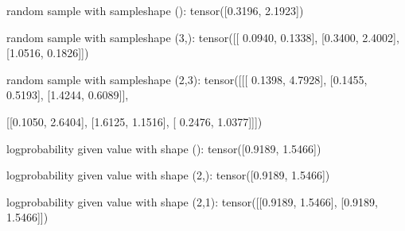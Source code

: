 \documentclass[letterpaper,10pt,english]{sphinxmanual}
\begin{document}
\begin{sphinxVerbatim}[commandchars=\\\{\}]
random sample with sample\PYGZus{}shape ():
 tensor([0.3196, 2.1923]) 

random sample with sample\PYGZus{}shape (3,):
 tensor([[ 0.0940,  0.1338],
        [\PYGZhy{}0.3400,  2.4002],
        [\PYGZhy{}1.0516, \PYGZhy{}0.1826]]) 

random sample with sample\PYGZus{}shape (2,3):
 tensor([[[ 0.1398,  4.7928],
         [\PYGZhy{}0.1455, \PYGZhy{}0.5193],
         [\PYGZhy{}1.4244, \PYGZhy{}0.6089]],

        [[\PYGZhy{}0.1050,  2.6404],
         [\PYGZhy{}1.6125,  1.1516],
         [ 0.2476,  1.0377]]])
\end{sphinxVerbatim}

\begin{sphinxVerbatim}[commandchars=\\\{\}]
       
      \PYG{p}{[} \PYG{p}{]} 
      \PYG{p}{[}\PYG{p}{[}\PYG{p}{]} \PYG{p}{[}\PYG{p}{]}\PYG{p}{]}
\end{sphinxVerbatim}

\begin{sphinxVerbatim}[commandchars=\\\{\}]
log\PYGZhy{}probability given value with shape ():
 tensor([\PYGZhy{}0.9189, \PYGZhy{}1.5466]) 

log\PYGZhy{}probability given value with shape (2,):
 tensor([\PYGZhy{}0.9189, \PYGZhy{}1.5466]) 

log\PYGZhy{}probability given value with shape (2,1):
 tensor([[\PYGZhy{}0.9189, \PYGZhy{}1.5466],
        [\PYGZhy{}0.9189, \PYGZhy{}1.5466]])
\end{sphinxVerbatim}
\end{document}
